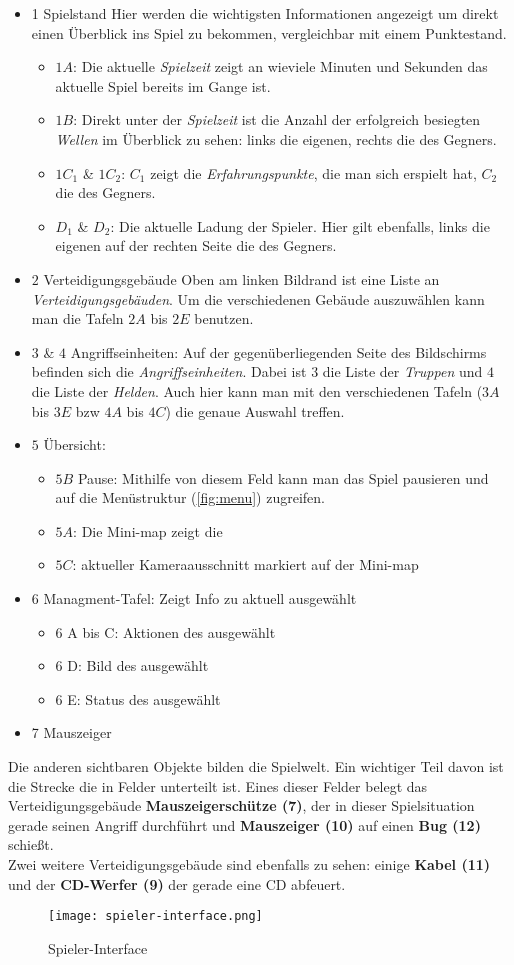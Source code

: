 \begin{itemize}
	\item{1 Spielstand} Hier werden die wichtigsten Informationen angezeigt um direkt einen Überblick ins Spiel zu bekommen, vergleichbar mit einem Punktestand.
	\begin{itemize}
		\item{$1 A$: Die aktuelle \textit{Spielzeit} zeigt an wieviele Minuten und Sekunden das aktuelle Spiel bereits im Gange ist.}
		\item{$1 B$: Direkt unter der \textit{Spielzeit} ist die Anzahl der erfolgreich besiegten \textit{Wellen} im Überblick zu sehen: links die eigenen, rechts die des Gegners.}
		\item{$1 C_{1}$ \& $1C_{2}$:} $C_{1}$ zeigt die \textit{Erfahrungspunkte}, die man sich erspielt hat, $C_{2}$ die des Gegners.
		\item{$D_{1}$ \& $D_{2}$:} Die aktuelle Ladung der Spieler. Hier gilt ebenfalls, links die eigenen auf der rechten Seite die des Gegners.
	\end{itemize}
	\item {$2$ Verteidigungsgebäude} Oben am linken Bildrand ist eine Liste an \textit{Verteidigungsgebäuden}. Um die verschiedenen Gebäude auszuwählen kann man die Tafeln $2 A$ bis $2 E$ benutzen.
	\item {$3$ \& $4$ Angriffseinheiten:} Auf der gegenüberliegenden Seite des Bildschirms befinden sich die \textit{Angriffseinheiten}. Dabei ist $3$ die Liste der \textit{Truppen} und $4$ die Liste der \textit{Helden}. Auch hier kann man mit den verschiedenen Tafeln ($3 A$ bis $3 E$ bzw $4 A$ bis $4 C$) die genaue Auswahl treffen.
	\item {$5$ Übersicht:}
	\begin{itemize}
		\item{$5 B$ Pause: Mithilfe von diesem Feld kann man das Spiel pausieren und auf die Menüstruktur (\ref{fig:menu}) zugreifen.}
		\item{$5 A$: Die Mini-map zeigt die}
		\item{$5 C$: aktueller Kameraausschnitt markiert auf der Mini-map}
	\end{itemize}
	\item {6 Managment-Tafel:} Zeigt Info zu aktuell ausgewählt
	\begin{itemize}
		\item{6 A bis C:} Aktionen des ausgewählt
		\item{6 D:} Bild des ausgewählt
		\item{6 E:} Status des ausgewählt
	\end{itemize}
	\item {7 Mauszeiger} 
\end{itemize}
Die anderen sichtbaren Objekte bilden die Spielwelt. Ein wichtiger Teil davon ist die Strecke die in Felder unterteilt ist. Eines dieser Felder belegt das Verteidigungsgebäude \textbf{Mauszeigerschütze (7)}, der in dieser Spielsituation gerade seinen Angriff durchführt und \textbf{Mauszeiger (10)} auf einen \textbf{Bug (12)} schießt.\\
Zwei weitere Verteidigungsgebäude sind ebenfalls zu sehen: einige \textbf{Kabel (11)} und der \textbf{CD-Werfer (9)} der gerade eine CD abfeuert.

\begin{figure}[ht]
	\centering
	\texttt{[image: spieler-interface.png]}
	\caption{Spieler-Interface}
	\label{fig:spieler-interface}
\end{figure}
